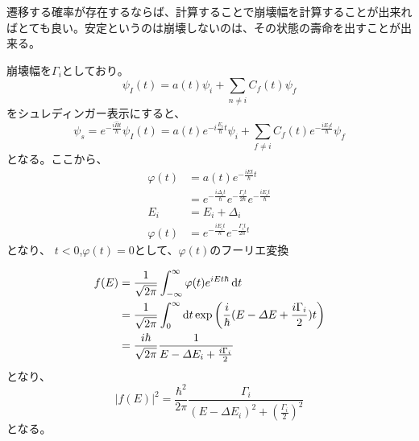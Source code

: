 \documentclass[titlepage]{ltjsarticle}
\begin{document}
遷移する確率が存在するならば、計算することで崩壊幅を計算することが出来ればとても良い。安定というのは崩壊しないのは、その状態の壽命を出すことが出来る。

崩壊幅を\(\Gamma_i\)としており。
\begin{equation}
  \psi_I (t) = a(t) \psi_i + \sum_{n\ne i} C_f(t) \psi_f
\end{equation}
をシュレディンガー表示にすると、
\begin{equation}
  \psi_s = e^{-\frac{i \hat{H}t}{\hbar}}\psi_I(t) = a(t) e^{- i \frac{E_i }{\hbar} t}\psi_i + \sum_{f \ne i} C_f(t)e^{-\frac{iE_f t}{\hbar}}\psi_f  
\end{equation}
となる。ここから、
\begin{align}
  \varphi(t) & = a(t) e^{-\frac{iE t}{\hbar}t} \\
  & = e^{-\frac{i \varDelta_i t }{\hbar}} e^{-\frac{\Gamma_i t}{2 \hbar}}e^{-\frac{iE_i t}{\hbar}}\\
  E_i & = E_i + \varDelta_i \\
  \varphi(t) & = e^{-\frac{iE_i t}{\hbar}} e^{-\frac{\Gamma_i t}{2 \hbar}t}
\end{align}
となり、
\(t<0\),\(\varphi(t)=0\)として、\(\varphi(t)\)のフーリエ変換

\begin{align}
  f(E) & = \frac{1}{\sqrt{2\pi}}\int_{-\infty }^{\infty} \varphi(t) e^{iEt \hbar} \odif{t}\\
  & = \frac{1}{\sqrt{2\pi}}\int^{\infty}_{0}\odif{t} \exp\left( \frac{i }{\hbar}(E-\varDelta{E}+\frac{i \Gamma_{i}}{2})t \right)\\
  & = \frac{i \hbar}{\sqrt{2\pi}}\frac{1}{E-\varDelta {E}_i +\frac{i \Gamma_i}{2}}
\end{align}
となり、
\begin{equation}
  |f(E)|^2 = \frac{\hbar^2}{2\pi} \frac{\Gamma_i}{(E-\varDelta {E}_i)^2 + \left( \frac{\Gamma_i}{2} \right)^2}
\end{equation}
となる。
\end{document}

